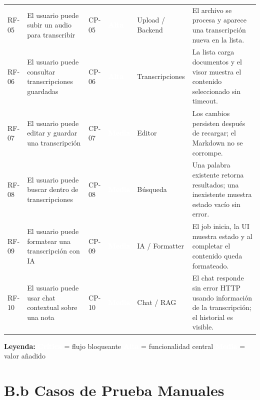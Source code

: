 \documentclass[12pt, a4paper]{article}
\newcommand{\prioChip}[2]{%
  \colorbox{#1}{\textcolor{white}{\footnotesize\textbf{#2}}}%
}
\begin{document}
\begin{landscape}
\begin{longtable}{C{1.4cm} L{4.8cm} C{1.5cm} C{2.2cm} C{2.8cm} L{6.5cm}}
RF-05 & El usuario puede subir un audio para transcribir & CP-05 & \prioChip{alta}{Alta} & Upload / Backend &
  El archivo se procesa y aparece una transcripci\'on nueva en la lista. \\[4pt]

RF-06 & El usuario puede consultar transcripciones guardadas & CP-06 & \prioChip{alta}{Alta} & Transcripciones &
  La lista carga documentos y el visor muestra el contenido seleccionado sin timeout. \\[4pt]

RF-07 & El usuario puede editar y guardar una transcripci\'on & CP-07 & \prioChip{media}{Media} & Editor &
  Los cambios persisten despu\'es de recargar; el Markdown no se corrompe. \\[4pt]

RF-08 & El usuario puede buscar dentro de transcripciones & CP-08 & \prioChip{media}{Media} & B\'usqueda &
  Una palabra existente retorna resultados; una inexistente muestra estado vac\'io sin error. \\[4pt]

RF-09 & El usuario puede formatear una transcripci\'on con IA & CP-09 & \prioChip{media}{Media} & IA / Formatter &
  El job inicia, la UI muestra estado y al completar el contenido queda formateado. \\[4pt]

RF-10 & El usuario puede usar chat contextual sobre una nota & CP-10 & \prioChip{media}{Media} & Chat / RAG &
  El chat responde sin error HTTP usando informaci\'on de la transcripci\'on; el historial es visible. \\[4pt]

\end{longtable}

\vspace{0.3cm}
\begin{tcolorbox}[colback=row-alt, colframe=espe-blue, boxrule=0.8pt, arc=3pt]
\footnotesize
\textbf{Leyenda:}\quad
\prioChip{critica}{Cr\'itica} = flujo bloqueante\quad
\prioChip{alta}{Alta} = funcionalidad central\quad
\prioChip{media}{Media} = valor a\~nadido
\end{tcolorbox}
\end{landscape}

\newpage

\section{B.b Casos de Prueba Manuales}
\end{document}
